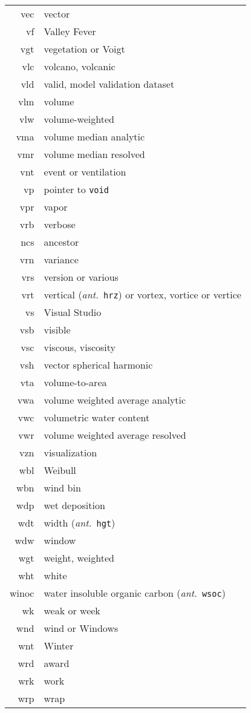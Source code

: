 \documentclass[12pt,twoside]{article}
\newcommand{\ant}[1]{(\textit{ant.}~\texttt{#1})}
\begin{document}
\begin{longtable}[>{\bfseries}l]{>{\ttfamily}r l}
vec & vector \\
vf & Valley Fever \\
vgt & vegetation or Voigt \\
vlc & volcano, volcanic \\
vld & valid, model validation dataset \\
vlm & volume \\
vlw & volume-weighted \\
vma & volume median analytic \\
vmr & volume median resolved \\
vnt & event or ventilation \\
vp & pointer to \texttt{void} \\
vpr & vapor \\
vrb & verbose \\
ncs & ancestor \\
vrn & variance \\
vrs & version or various \\
vrt & vertical \ant{hrz} or vortex, vortice or vertice \\
vs & Visual Studio \\
vsb & visible \\
vsc & viscous, viscosity \\
vsh & vector spherical harmonic \\
vta & volume-to-area \\
vwa & volume weighted average analytic \\
vwc & volumetric water content \\
vwr & volume weighted average resolved \\
vzn & visualization \\
wbl & Weibull \\
wbn & wind bin \\
wdp & wet deposition \\
wdt & width \ant{hgt} \\
wdw & window \\
wgt & weight, weighted \\
wht & white \\
winoc & water insoluble organic carbon \ant{wsoc} \\
wk & weak or week \\
wnd & wind or Windows \\
wnt & Winter \\
wrd & award \\
wrk & work \\
wrp & wrap \\

\end{longtable}
\end{document}

